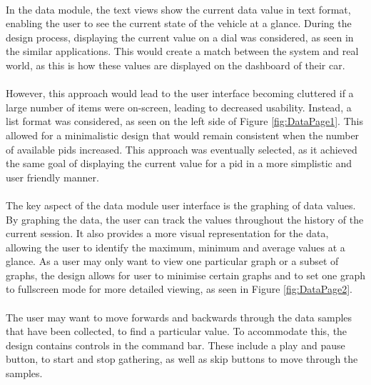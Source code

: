 		\paragraph{}{
		In the data module, the text views show the current data value in text format, enabling the user to see the current state of the vehicle at a glance. During the design process, displaying the current value on a dial was considered, as seen in the similar applications. This would create a match between the system and real world, as this is how these values are displayed on the dashboard of their car.
		}
		\paragraph{}{
		However, this approach would lead to the user interface becoming cluttered if a large number of items were on-screen, leading to decreased usability. Instead, a list format was considered, as seen on the left side of Figure \ref{fig:DataPage1}. This allowed for a minimalistic design that would remain consistent when the number of available pids increased. This approach was eventually selected, as it achieved the same goal of displaying the current value for a pid in a more simplistic and user friendly manner.
		}
		\paragraph{}{
		The key aspect of the data module user interface is the graphing of data values. By graphing the data, the user can track the values throughout the history of the current session. It also provides a more visual representation for the data, allowing the user to identify the maximum, minimum and average values at a glance. As a user may only want to view one particular graph or a subset of graphs, the design allows for user to minimise certain graphs and to set one graph to fullscreen mode for more detailed viewing, as seen in Figure \ref{fig:DataPage2}.
		}
		\paragraph{}{
		The user may want to move forwards and backwards through the data samples that have been collected, to find a particular value. To accommodate this, the design contains controls in the command bar. These include a play and pause button, to start and stop gathering, as well as skip buttons to move through the samples.
		}
		
